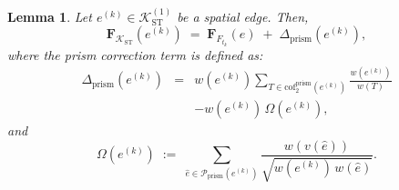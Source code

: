\documentclass[
    pre,
    twocolumn,
    superscriptaddress,
    showpacs,
    nofootinbib,
    amsmath,
    amssymb,
    floatfix
]{revtex4-2}
\newcommand{\K}{\mathcal{K}}
\newcommand{\F}{\mathbf{F}}        %
\theoremstyle{plain} %
\newtheorem{lemma}[theorem]{\indent Lemma}
\theoremstyle{definition} %
\begin{document}
\begin{lemma}\label{lem:coupling}
Let $e^{(k)} \in \K_{\mathrm{ST}}^{(1)}$ be a spatial edge.
Then,
\begin{equation*}\label{eq:coupling}
\F_{\K_{\mathrm{ST}}}(e^{(k)}) \;=\; \F_{F_{t_k}}(e) \;+\; \Delta_{\mathrm{prism}}(e^{(k)}),
\end{equation*}
where the prism correction term is defined as:
\begin{eqnarray*}\label{eq:prism_correction}
\Delta_{\mathrm{prism}}(e^{(k)}) &=& w(e^{(k)})\!\sum_{T\in\mathrm{cof}_2^{\mathrm{prism}}(e^{(k)})}\!\frac{w(e^{(k)})}{w(T)} \\
&\ & - w(e^{(k)})\,\Omega(e^{(k)}),
\end{eqnarray*}
and
\begin{equation*}\label{eq:omega_def}
\Omega(e^{(k)}) \;:=\; \sum_{\hat e \in \mathcal{P}_{\mathrm{prism}}(e^{(k)})} \frac{w(v(\hat e))}{\sqrt{w(e^{(k)})\,w(\hat e)}}.
\end{equation*}
\end{lemma}
\end{document}
